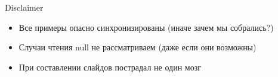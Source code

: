 %
\ifrender
\begin{frame}[fragile]{Disclaimer}%
\begin{itemize}[<+->]
\item Все примеры опасно синхронизированы (иначе зачем мы собрались?)
\item Случаи чтения null не рассматриваем (даже если они возможны)
\item При составлении слайдов пострадал не один мозг
\end{itemize}
\end{frame}
\fi
